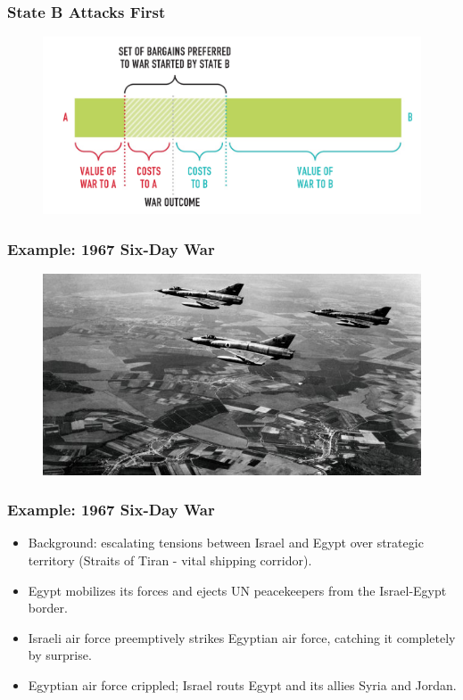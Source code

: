 \documentclass{beamer}
\begin{document}
\begin{frame} 
	\frametitle{\LARGE{State B Attacks First}}
	\begin{figure}[ht!]
		\centering
		\includegraphics[width=\textwidth,height=0.8\textheight,keepaspectratio]{./statebfirst.png}
	\end{figure}
\end{frame}

\begin{frame} 
	\frametitle{\LARGE{Example: 1967 Six-Day War}}
	\begin{figure}[ht!]
		\centering
		\includegraphics[width=\textwidth,height=0.8\textheight,keepaspectratio]{IsraelAF.jpg}
	\end{figure}
\end{frame}

\begin{frame} 
	\frametitle{\LARGE{Example: 1967 Six-Day War}}
	\begin{itemize}
		\item Background: escalating tensions between Israel and Egypt over strategic territory (Straits of Tiran - vital shipping corridor). \pause
		\item Egypt mobilizes its forces and ejects UN peacekeepers from the Israel-Egypt border. \pause
		\item Israeli air force preemptively strikes Egyptian air force, catching it completely by surprise. \pause
		\item Egyptian air force crippled; Israel routs Egypt and its allies Syria and Jordan.
	\end{itemize}
\end{frame}
\end{document}
